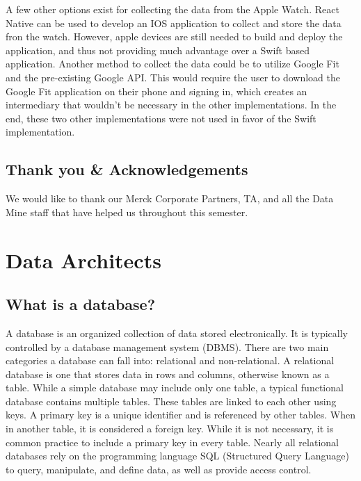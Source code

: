 \documentclass[]{book}
\begin{document}
A few other options exist for collecting the data from the Apple Watch.
React Native can be used to develop an IOS application to collect and
store the data fron the watch. However, apple devices are still needed
to build and deploy the application, and thus not providing much
advantage over a Swift based application. Another method to collect the
data could be to utilize Google Fit and the pre-existing Google API.
This would require the user to download the Google Fit application on
their phone and signing in, which creates an intermediary that wouldn't
be necessary in the other implementations. In the end, these two other
implementations were not used in favor of the Swift implementation.

\section{Thank you \&
Acknowledgements}\label{thank-you-acknowledgements}

We would like to thank our Merck Corporate Partners, TA, and all the
Data Mine staff that have helped us throughout this semester.

\chapter{Data Architects}\label{data-architects}

\section{What is a database?}\label{what-is-a-database}

A database is an organized collection of data stored electronically. It
is typically controlled by a database management system (DBMS). There
are two main categories a database can fall into: relational and
non-relational. A relational database is one that stores data in rows
and columns, otherwise known as a table. While a simple database may
include only one table, a typical functional database contains multiple
tables. These tables are linked to each other using keys. A primary key
is a unique identifier and is referenced by other tables. When in
another table, it is considered a foreign key. While it is not
necessary, it is common practice to include a primary key in every
table. Nearly all relational databases rely on the programming language
SQL (Structured Query Language) to query, manipulate, and define data,
as well as provide access control.
\end{document}
